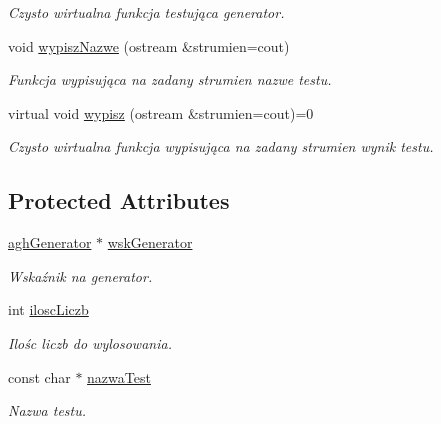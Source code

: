 \begin{DoxyCompactItemize}
\begin{DoxyCompactList}\small\item\em \-Czysto wirtualna funkcja testująca generator. \end{DoxyCompactList}\item 
void \hyperlink{classaghTest_aa278aea7075db6ddf520b193038265a5}{wypisz\-Nazwe} (ostream \&strumien=cout)
\begin{DoxyCompactList}\small\item\em \-Funkcja wypisująca na zadany strumien nazwe testu. \end{DoxyCompactList}\item 
virtual void \hyperlink{classaghTest_ad43c3c9a98d652936d9a5fe90aa1b57b}{wypisz} (ostream \&strumien=cout)=0
\begin{DoxyCompactList}\small\item\em \-Czysto wirtualna funkcja wypisująca na zadany strumien wynik testu. \end{DoxyCompactList}\end{DoxyCompactItemize}
\subsection*{\-Protected \-Attributes}
\begin{DoxyCompactItemize}
\item 
\hypertarget{classaghTest_a857cc9a7264a6c91d570dca932b170a1}{\hyperlink{classaghGenerator}{agh\-Generator} $\ast$ \hyperlink{classaghTest_a857cc9a7264a6c91d570dca932b170a1}{wsk\-Generator}}\label{classaghTest_a857cc9a7264a6c91d570dca932b170a1}

\begin{DoxyCompactList}\small\item\em \-Wskaźnik na generator. \end{DoxyCompactList}\item 
\hypertarget{classaghTest_ac7b2b561a6c98219dd5ba7a7e24bd1d9}{int \hyperlink{classaghTest_ac7b2b561a6c98219dd5ba7a7e24bd1d9}{ilosc\-Liczb}}\label{classaghTest_ac7b2b561a6c98219dd5ba7a7e24bd1d9}

\begin{DoxyCompactList}\small\item\em \-Ilośc liczb do wylosowania. \end{DoxyCompactList}\item 
\hypertarget{classaghTest_a81d6064593d5da46e32f4e1ecdc45550}{const char $\ast$ \hyperlink{classaghTest_a81d6064593d5da46e32f4e1ecdc45550}{nazwa\-Test}}\label{classaghTest_a81d6064593d5da46e32f4e1ecdc45550}

\begin{DoxyCompactList}\small\item\em \-Nazwa testu. \end{DoxyCompactList}\end{DoxyCompactItemize}


